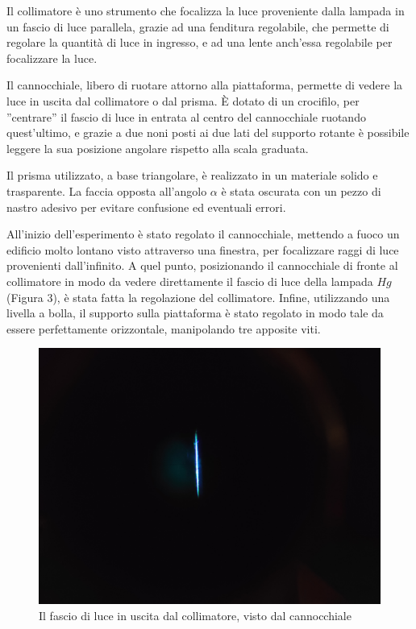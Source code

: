 \documentclass{article}
\begin{document}
\vspace{5mm}

Il collimatore è uno strumento che focalizza la luce proveniente dalla lampada in un fascio di luce parallela, grazie ad una fenditura regolabile, che permette di regolare la quantità di luce in ingresso, e ad una lente anch'essa regolabile per focalizzare la luce.

\vspace{5mm}

Il cannocchiale, libero di ruotare attorno alla piattaforma, permette di vedere la luce in uscita dal collimatore o dal prisma. È dotato di un crocifilo, per ''centrare'' il fascio di luce in entrata al centro del cannocchiale ruotando quest'ultimo, e grazie a due noni posti ai due lati del supporto rotante è possibile leggere la sua posizione angolare rispetto alla scala graduata. 

\vspace{5mm}

Il prisma utilizzato, a base triangolare, è realizzato in un materiale solido e trasparente. La faccia opposta all'angolo $\alpha$ è stata oscurata con un pezzo di nastro adesivo per evitare confusione ed eventuali errori.

\vspace{5mm}

All'inizio dell'esperimento è stato regolato il cannocchiale, mettendo a fuoco un edificio molto lontano visto attraverso una finestra, per focalizzare raggi di luce provenienti dall'infinito. A quel punto, posizionando il cannocchiale di fronte al collimatore in modo da vedere direttamente il fascio di luce della lampada $Hg$ (Figura 3), è stata fatta la regolazione del collimatore. Infine, utilizzando una livella a bolla, il supporto sulla piattaforma è stato regolato in modo tale da essere perfettamente orizzontale, manipolando tre apposite viti.

\vspace{5mm}

\begin{figure}[h]
  \centering
  \includegraphics[width=0.5\linewidth]{FotoPrisma2}
  \caption{Il fascio di luce in uscita dal collimatore, visto dal cannocchiale}
\end{figure}
\end{document}
